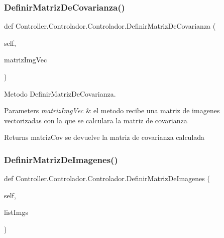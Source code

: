 \subsubsection{\texorpdfstring{Definir\+Matriz\+De\+Covarianza()}{DefinirMatrizDeCovarianza()}}
{\footnotesize\ttfamily def Controller.\+Controlador.\+Controlador.\+Definir\+Matriz\+De\+Covarianza (\begin{DoxyParamCaption}\item[{}]{self,  }\item[{}]{matriz\+Img\+Vec }\end{DoxyParamCaption})}



Metodo Definir\+Matriz\+De\+Covarianza. 


\begin{DoxyParams}{Parameters}
{\em matriz\+Img\+Vec} & el metodo recibe una matriz de imagenes vectorizadas con la que se calculara la matriz de covarianza \\
\hline
\end{DoxyParams}
\begin{DoxyReturn}{Returns}
matriz\+Cov se devuelve la matriz de covarianza calculada 
\end{DoxyReturn}
\mbox{\label{class_controller_1_1_controlador_1_1_controlador_a88254f919a6b1d7ed25e2f54b528a15c}} 
\subsubsection{\texorpdfstring{Definir\+Matriz\+De\+Imagenes()}{DefinirMatrizDeImagenes()}}
{\footnotesize\ttfamily def Controller.\+Controlador.\+Controlador.\+Definir\+Matriz\+De\+Imagenes (\begin{DoxyParamCaption}\item[{}]{self,  }\item[{}]{list\+Imgs }\end{DoxyParamCaption})}

\mbox{\label{class_controller_1_1_controlador_1_1_controlador_a4bbeb1232cf73c6c9113e7ffda714b63}} 
